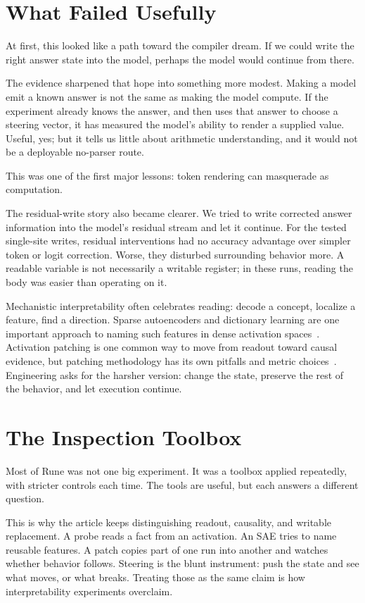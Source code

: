 \documentclass[acmsmall,screen,nonacm]{acmart}
\begin{document}
\section{What Failed Usefully}

At first, this looked like a path toward the compiler dream. If we could write
the right answer state into the model, perhaps the model would continue from
there.

The evidence sharpened that hope into something more modest. Making a model
emit a known answer is not the same as making the model compute. If the
experiment already knows the answer, and then uses that answer to choose a
steering vector, it has measured the model's ability to render a supplied
value. Useful, yes; but it tells us little about arithmetic understanding, and
it would not be a deployable no-parser route.

This was one of the first major lessons: token rendering can masquerade as
computation.

The residual-write story also became clearer. We tried to write corrected
answer information into the model's residual stream and let it continue. For
the tested single-site writes, residual interventions had no accuracy advantage
over simpler token or logit correction. Worse, they disturbed surrounding
behavior more. A readable variable is not necessarily a writable register; in
these runs, reading the body was easier than operating on it.

Mechanistic interpretability often celebrates reading: decode a concept,
localize a feature, find a direction. Sparse autoencoders and dictionary
learning are one important approach to naming such features in dense activation
spaces~\cite{bricken2023,cunningham2023}. Activation patching is one common way
to move from readout toward causal evidence, but patching methodology has its
own pitfalls and metric choices~\cite{zhang2023patching}. Engineering asks for
the harsher version: change the state, preserve the rest of the behavior, and
let execution continue.

\section{The Inspection Toolbox}

Most of Rune was not one big experiment. It was a toolbox applied repeatedly,
with stricter controls each time. The tools are useful, but each answers a
different question.

This is why the article keeps distinguishing readout, causality, and writable
replacement. A probe reads a fact from an activation. An SAE tries to name
reusable features. A patch copies part of one run into another and watches
whether behavior follows. Steering is the blunt instrument: push the state and
see what moves, or what breaks. Treating those as the same claim is how
interpretability experiments overclaim.
\end{document}
